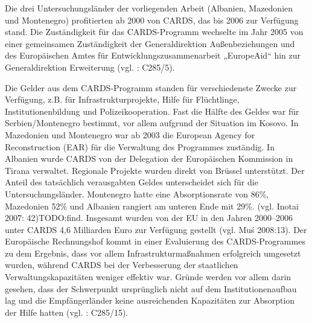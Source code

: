 Die drei Untersuchungsländer der vorliegenden Arbeit (Albanien, Mazedonien und Montenegro) profitierten ab 2000 von CARDS, das bis 2006 zur Verfügung stand. Die Zuständigkeit für das CARDS-Programm wechselte im Jahr 2005 von einer gemeinsamen Zuständigkeit der Generaldirektion Außenbeziehungen und des Europäischen Amtes für Entwicklungszusammenarbeit „EuropeAid“ hin zur Generaldirektion Erweiterung (vgl. \cite{eurrh}: C285/5).\par
Die Gelder aus dem CARDS-Programm standen für verschiedenste Zwecke zur Verfügung, z.B. für Infrastrukturprojekte, Hilfe für Flüchtlinge, Institutionenbildung und Polizeikooperation. Fast die Hälfte des Geldes war für Serbien/Montenegro bestimmt, vor allem aufgrund der Situation im Kosovo. In Mazedonien und Montenegro war ab 2003 die European Agency for Reconstruction (EAR) für die Verwaltung des Programmes zuständig. In Albanien wurde CARDS von der Delegation der Europäischen Kommission in Tirana verwaltet. Regionale Projekte wurden direkt von Brüssel unterstützt. Der Anteil des tatsächlich verausgabten Geldes unterscheidet sich für die Untersuchungsländer. Montenegro hatte eine Absorptionsrate von 86\%, Mazedonien 52\% und Albanien rangiert am unteren Ende mit 29\%. (vgl. Inotai 2007: 42)TODO:find. Insgesamt wurden von der EU in den Jahren 2000–2006 unter CARDS 4,6 Milliarden Euro zur Verfügung gestellt (vgl. Muś 2008:13). Der Europäische Rechnungshof kommt in einer Evaluierung des CARDS-Programmes zu dem Ergebnis, dass vor allem Infrastrukturmaßnahmen erfolgreich umgesetzt wurden, während CARDS bei der Verbesserung der staatlichen Verwaltungskapazitäten weniger effektiv war. Gründe werden vor allem darin gesehen, dass der Schwerpunkt ursprünglich nicht auf dem Institutionenaufbau lag und die Empfängerländer keine ausreichenden Kapazitäten zur Absorption der Hilfe hatten (vgl. \cite{eurrh}: C285/15).
